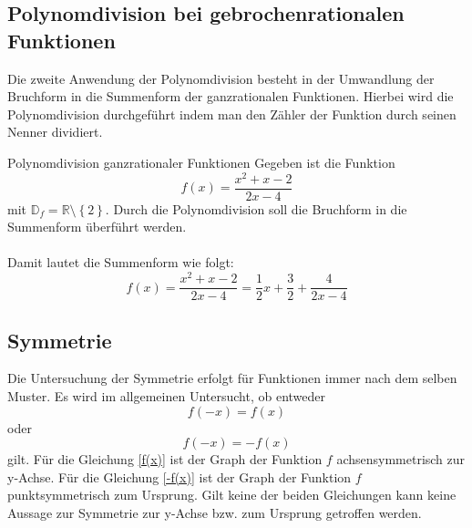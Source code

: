 \subsection{Polynomdivision bei gebrochenrationalen Funktionen}\label{polynomdivisionBruch}
Die zweite Anwendung der Polynomdivision besteht in der Umwandlung der Bruchform in die Summenform der ganzrationalen Funktionen. Hierbei wird die Polynomdivision durchgeführt indem man den Zähler der Funktion durch seinen Nenner dividiert.
\begin{bsp}{Polynomdivision ganzrationaler Funktionen}{}
Gegeben ist die Funktion $$f(x)=\dfrac{x^2+x-2}{2x-4}$$ mit $\mathds{D}_f=\mathds{R}\setminus \left\{ 2 \right\}$. Durch die Polynomdivision soll die Bruchform in die Summenform überführt werden.\\
\\
Damit lautet die Summenform wie folgt:
$$f(x)=\dfrac{x^2+x-2}{2x-4} = \dfrac{1}{2} x +\dfrac{3}{2} +\dfrac{4}{2x-4} $$
\end{bsp}
\subsection{Symmetrie} 
Die Untersuchung der Symmetrie erfolgt für Funktionen immer nach dem selben Muster. Es wird im allgemeinen Untersucht, ob entweder \begin{equation}\label{f(x)}
    f(-x) = f(x)
\end{equation} oder 
\begin{equation} \label{-f(x)}
f(-x) = -f(x) 
\end{equation} gilt. Für die Gleichung \ref{f(x)} ist der Graph der Funktion $f$ achsensymmetrisch zur y-Achse. Für die Gleichung \ref{-f(x)} ist der Graph der Funktion $f$ punktsymmetrisch zum Ursprung. Gilt keine der beiden Gleichungen kann keine Aussage zur Symmetrie zur y-Achse bzw. zum Ursprung getroffen werden. 
\begin{center}
\end{center}
